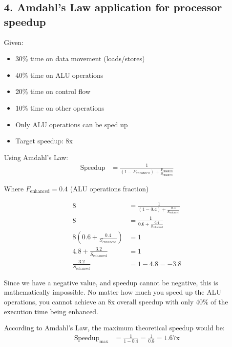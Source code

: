 \documentclass[12pt]{article}
\begin{document}
\subsection*{4. Amdahl's Law application for processor speedup}
Given:
\begin{itemize}
    \item 30\% time on data movement (loads/stores)
    \item 40\% time on ALU operations
    \item 20\% time on control flow
    \item 10\% time on other operations
    \item Only ALU operations can be sped up
    \item Target speedup: 8x
\end{itemize}

Using Amdahl's Law:
\begin{align}
\text{Speedup} &= \frac{1}{(1-F_{\text{enhanced}}) + \frac{F_{\text{enhanced}}}{S_{\text{enhanced}}}}
\end{align}

Where $F_{\text{enhanced}} = 0.4$ (ALU operations fraction)

\begin{align}
8 &= \frac{1}{(1-0.4) + \frac{0.4}{S_{\text{enhanced}}}}\\
8 &= \frac{1}{0.6 + \frac{0.4}{S_{\text{enhanced}}}}\\
8\left(0.6 + \frac{0.4}{S_{\text{enhanced}}}\right) &= 1\\
4.8 + \frac{3.2}{S_{\text{enhanced}}} &= 1\\
\frac{3.2}{S_{\text{enhanced}}} &= 1 - 4.8 = -3.8
\end{align}

Since we have a negative value, and speedup cannot be negative, this is mathematically impossible. No matter how much you speed up the ALU operations, you cannot achieve an 8x overall speedup with only 40\% of the execution time being enhanced.

According to Amdahl's Law, the maximum theoretical speedup would be:
\begin{align}
\text{Speedup}_{\text{max}} &= \frac{1}{1-0.4} = \frac{1}{0.6} = 1.67\text{x}
\end{align}
\end{document}
